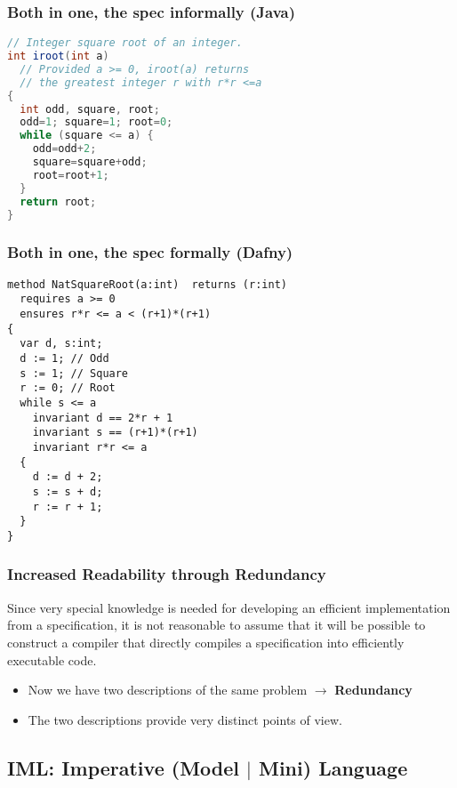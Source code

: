 \begin{multicols}{2}
\subsubsection{Both in one, the spec informally (Java)}
\begin{lstlisting}[language=Java]
// Integer square root of an integer.
int iroot(int a)
  // Provided a >= 0, iroot(a) returns
  // the greatest integer r with r*r <=a
{
  int odd, square, root;
  odd=1; square=1; root=0;
  while (square <= a) {
    odd=odd+2;
    square=square+odd;
    root=root+1;
  }
  return root;
}
\end{lstlisting}

\subsubsection{Both in one, the spec formally (Dafny)}
\begin{lstlisting}
method NatSquareRoot(a:int)  returns (r:int)
  requires a >= 0
  ensures r*r <= a < (r+1)*(r+1)
{
  var d, s:int;
  d := 1; // Odd
  s := 1; // Square
  r := 0; // Root
  while s <= a
    invariant d == 2*r + 1
    invariant s == (r+1)*(r+1)
    invariant r*r <= a
  {
    d := d + 2;
    s := s + d;
    r := r + 1;
  }
}
\end{lstlisting}

\subsubsection{Increased Readability through Redundancy}
Since very special knowledge is needed for developing an efficient implementation from a specification, it is not reasonable to assume that it will be possible to construct a compiler that directly compiles a specification into efficiently executable code.
\begin{itemize}
  \item Now we have two descriptions of the same problem $\rightarrow$ \textbf{Redundancy}
  \item The two descriptions provide very distinct points of view.
\end{itemize}

\subsection{IML: Imperative (Model $|$ Mini) Language}


\end{multicols}

